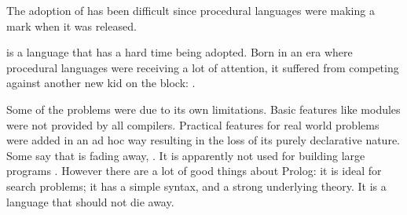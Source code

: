 \documentclass[thesis-solanki.tex]{subfiles}
\begin{document}
\begin{comment}
\progLang{Prolog} has a similar story. It was born in an era where procedural programming had made everyone notice their presence. Talking about
competition, it was against something radical; the \progLang{C} programming language. The languages \progLang{C} has influenced is off the chart and
so is the performance. It had paved the way for structured procedural programming and had given birth to the Unix operating system. Though the
original version of \progLang{Prolog} has given rise to a large number of different flavours but a few drawbacks remain through the bloodline and as a
result it did become the first choice. Some basic requirements such as modules are not provided by all compilers. To make it do real world stuff, a set of
practical features are pushed in now and then which results in the loss of the purely declarative charm. The problem is that \progLang{Prolog} is fading
away, \cite{website:prolog-steam,website:prolog-death,website:prolog-killer}, not many people use it and most of the times when it is used, the variant
is usually \textit{practical} \progLang{Prolog} and the area being academia. It is not used for building large programs \cite{wikiprolog,somogyi1995
logic,website:prolog1000db}. But there are a lot of good things about \progLang{Prolog} that should not die away. Moreover, \progLang{Prolog} is ideal
for search problems.
\end{comment}

The adoption of  has been difficult since procedural languages were making a mark when it was released.

 is a language that has a hard time being adopted.
Born in an era where procedural languages were receiving a lot of attention, it suffered from competing against another
new kid on the block: .

Some of the problems were due to its own limitations.
Basic features like modules were not provided by all compilers.
Practical features for real world problems were added in an ad hoc way resulting in the loss of its purely declarative
nature.
Some say that  is fading away, \cite{website:prolog-steam,website:prolog-death,website:prolog-killer}.
It is apparently not used for building large programs \cite{wikiprolog,somogyi1995logic,website:prolog1000db}.
However there are a lot of good things about Prolog: it is ideal for search problems; it has a simple syntax, and a
strong underlying theory.
It is a language that should not die away.
\end{document}
